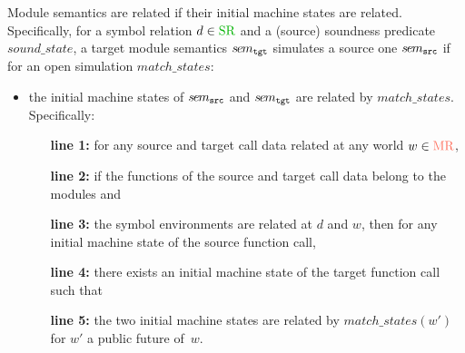 Module semantics are related if their initial machine states are related.
Specifically, for a symbol relation $d \in \SREL$ and a (source) soundness predicate $sound\_state$,
a target module semantics $s\hspace{-0.25mm}e\hspace{-0.25mm}m_{\texttt{tgt}}$ simulates a source one $s\hspace{-0.25mm}e\hspace{-0.25mm}m_{\texttt{src}}$ if for an open simulation $match\_states$:
\begin{itemize}
\item {} the initial machine states of $s\hspace{-0.25mm}e\hspace{-0.25mm}m_{\texttt{src}}$ and $s\hspace{-0.25mm}e\hspace{-0.25mm}m_{\texttt{tgt}}$ are related by $match\_states$.
Specifically: 
\begin{itemize}[leftmargin=11mm]
\item[\textbf{line 1:}] for any source and target call data related at any world $w \in \MREL$,
\item[\textbf{line 2:}] if the functions of the source and target call data belong to the modules and
\item[\textbf{line 3:}] the symbol environments are related at $d$ and $w$, then for any initial machine state of the source function call,
\item[\textbf{line 4:}] there exists an initial machine state of the target function call such that
\item[\textbf{line 5:}] the two initial machine states are related by $match\_states(w')$
  for $w'$ a public future of~$w$.
\end{itemize}
\end{itemize}


